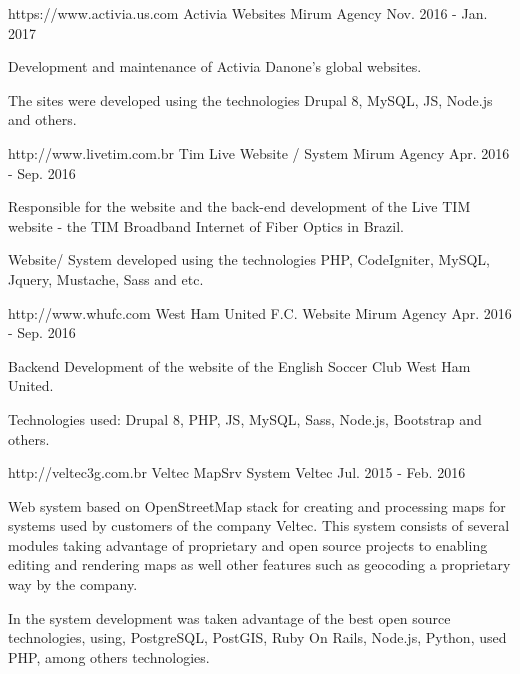 \begin{cventries}
  \cventry
    {https://www.activia.us.com} %
    {Activia Websites} %
    {Mirum Agency} %
    {Nov. 2016 - Jan. 2017} %
    {
      \begin{cvitems} %
        \item {Development and maintenance of Activia Danone's global websites.}
        \item {The sites were developed using the technologies Drupal 8, MySQL, JS, Node.js and others.}
      \end{cvitems}
    }


  \cventry
    {http://www.livetim.com.br} %
    {Tim Live Website / System} %
    {Mirum Agency} %
    {Apr. 2016 - Sep. 2016} %
    {
      \begin{cvitems} %
        \item {Responsible for the website and the back-end development of the Live TIM website - the TIM Broadband Internet of Fiber Optics in Brazil.}
        \item {Website/ System developed using the technologies PHP, CodeIgniter, MySQL, Jquery, Mustache, Sass and etc.}
      \end{cvitems}
    }


 \cventry
    {http://www.whufc.com} %
    {West Ham United F.C. Website} %
    {Mirum Agency} %
    {Apr. 2016 - Sep. 2016} %
    {
      \begin{cvitems} %
        \item {Backend Development of the website of the English Soccer Club West Ham United.}
         \item { Technologies used: Drupal 8, PHP, JS, MySQL, Sass, Node.js, Bootstrap and others.}
      \end{cvitems}
    }


 \cventry
    {http://veltec3g.com.br} %
    {Veltec MapSrv System} %
    {Veltec} %
    {Jul. 2015 - Feb. 2016} %
    {
      \begin{cvitems} %
        \item {Web system based on OpenStreetMap stack for creating and processing maps for systems used by customers of the company Veltec. This system consists of several modules taking advantage of proprietary and open source projects to enabling editing and rendering maps as well other features such as geocoding a proprietary way by the company.}
         \item {In the system development was taken advantage of the best open source technologies, using, PostgreSQL, PostGIS, Ruby On Rails, Node.js, Python, used PHP, among others technologies.}
      \end{cvitems}
    }

\end{cventries}

